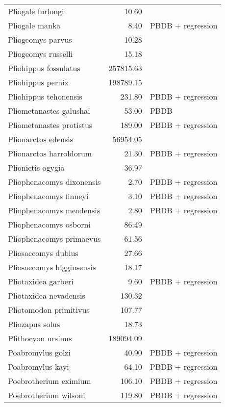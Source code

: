 \begin{table}[ht]
\begin{tabular}{lrl}
  Pliogale furlongi & 10.60 & \cite{Wood1962} \\ 
  Pliogale manka & 8.40 & PBDB + regression \\ 
  Pliogeomys parvus & 10.28 & \cite{Tomiya2013} \\ 
  Pliogeomys russelli & 15.18 & \cite{Tomiya2013} \\ 
  Pliohippus fossulatus & 257815.63 & \cite{Tomiya2013} \\ 
  Pliohippus pernix & 198789.15 & \cite{Tomiya2013} \\ 
  Pliohippus tehonensis & 231.80 & PBDB + regression \\ 
  Pliometanastes galushai & 53.00 & PBDB \\ 
  Pliometanastes protistus & 189.00 & PBDB + regression \\ 
  Plionarctos edensis & 56954.05 & \cite{Tomiya2013} \\ 
  Plionarctos harroldorum & 21.30 & PBDB + regression \\ 
  Plionictis ogygia & 36.97 & \cite{Tomiya2013} \\ 
  Pliophenacomys dixonensis & 2.70 & PBDB + regression \\ 
  Pliophenacomys finneyi & 3.10 & PBDB + regression \\ 
  Pliophenacomys meadensis & 2.80 & PBDB + regression \\ 
  Pliophenacomys osborni & 86.49 & \cite{Tomiya2013} \\ 
  Pliophenacomys primaevus & 61.56 & \cite{Tomiya2013} \\ 
  Pliosaccomys dubius & 27.66 & \cite{Tomiya2013} \\ 
  Pliosaccomys higginsensis & 18.17 & \cite{Tomiya2013} \\ 
  Pliotaxidea garberi & 9.60 & PBDB + regression \\ 
  Pliotaxidea nevadensis & 130.32 & \cite{Tomiya2013} \\ 
  Pliotomodon primitivus & 107.77 & \cite{Tomiya2013} \\ 
  Pliozapus solus & 18.73 & \cite{Tomiya2013} \\ 
  Plithocyon ursinus & 189094.09 & \cite{Tomiya2013} \\ 
  Poabromylus golzi & 40.90 & PBDB + regression \\ 
  Poabromylus kayi & 64.10 & PBDB + regression \\ 
  Poebrotherium eximium & 106.10 & PBDB + regression \\ 
  Poebrotherium wilsoni & 119.80 & PBDB + regression \\ 

\end{tabular}
\end{table}
